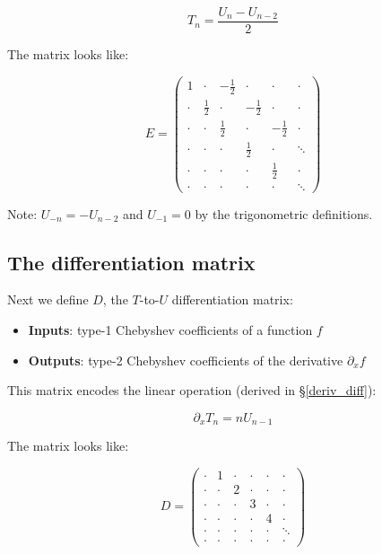 \documentclass{article}
\begin{document}
\begin{equation*}
T_n = \frac{U_n - U_{n-2}}{2}
\end{equation*} 

The matrix looks like:

\begin{equation*}
\renewcommand*{\arraystretch}{1.5}
E =
\begin{pmatrix}
1 & \cdot & -\frac{1}{2} & \cdot & \cdot & \cdot \\
\cdot & \frac{1}{2} & \cdot & -\frac{1}{2} & \cdot & \cdot \\
\cdot & \cdot & \frac{1}{2} & \cdot & -\frac{1}{2} & \cdot \\
\cdot & \cdot & \cdot & \frac{1}{2} & \cdot & \ddots \\
\cdot & \cdot & \cdot & \cdot & \frac{1}{2} & \cdot \\
\cdot & \cdot & \cdot & \cdot & \cdot & \ddots
\end{pmatrix}
\end{equation*}

Note: $U_{-n} = - U_{n-2}$ and $U_{-1} = 0$ by the trigonometric definitions. 

\subsection{The differentiation matrix}

Next we define $D$, the $T$-to-$U$ differentiation matrix:

\begin{itemize}
    \item \textbf{Inputs}: type-1 Chebyshev coefficients of a function $f$
    \item \textbf{Outputs}: type-2 Chebyshev coefficients of the derivative $\partial_x f$
\end{itemize}

This matrix encodes the linear operation (derived in \S \ref{deriv_diff}):

\begin{equation*}
\partial_x T_n = n U_{n-1}
\end{equation*}

The matrix looks like:

\begin{equation*}
\renewcommand*{\arraystretch}{1.2}
D =
\begin{pmatrix}
\cdot & 1 & \cdot & \cdot & \cdot & \cdot \\
\cdot & \cdot & 2 & \cdot & \cdot & \cdot \\
\cdot & \cdot & \cdot & 3 & \cdot & \cdot \\
\cdot & \cdot & \cdot & \cdot & 4 & \cdot \\
\cdot & \cdot & \cdot & \cdot & \cdot & \ddots \\
\cdot & \cdot & \cdot & \cdot & \cdot & \cdot
\end{pmatrix}
\end{equation*}
\end{document}
